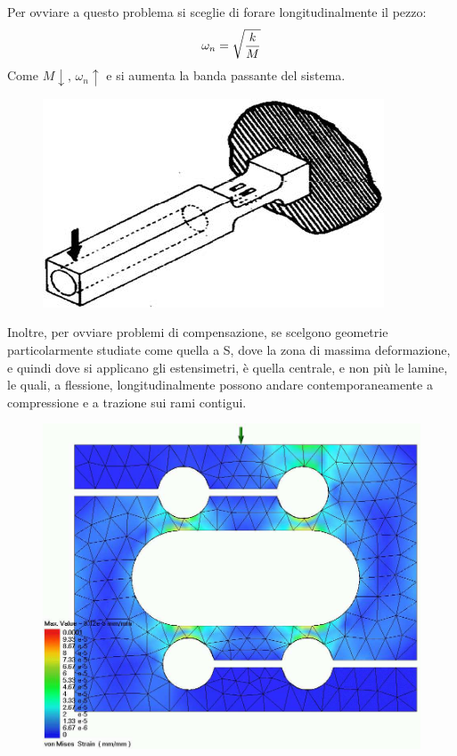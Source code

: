 \documentclass[a4paper, 15pt]{article}
\newcommand{\xmark}{\ding{55}}
\begin{document}
\begin{adjustwidth}{2in}{}
\begin{itemize}[label=\textcolor{red}{\xmark}]
 			Per ovviare a questo problema si sceglie di forare longitudinalmente il pezzo: 
 			\[\omega_n=\sqrt{k\over M}\]
 			Come $M\downarrow, \, \omega_n\uparrow$ e si aumenta la banda passante del sistema. 
 			\begin{figure}[H]
 				\centering
 				\includegraphics[width=0.3\linewidth]{immagini/16}
 				\label{fig:16}
 			\end{figure}
 		\end{itemize}
 		Inoltre, per ovviare problemi di compensazione, se scelgono geometrie particolarmente studiate come quella a S, dove la zona di massima deformazione, e quindi dove si applicano gli estensimetri, è quella centrale, e non più le lamine, le quali, a flessione, longitudinalmente possono andare contemporaneamente a compressione e a trazione sui rami contigui.
 		\begin{figure}[H]
 			\centering
 			\includegraphics[width=0.5\linewidth]{immagini/17}
 			\label{fig:17}
 		\end{figure}
\end{adjustwidth}
\end{document}
